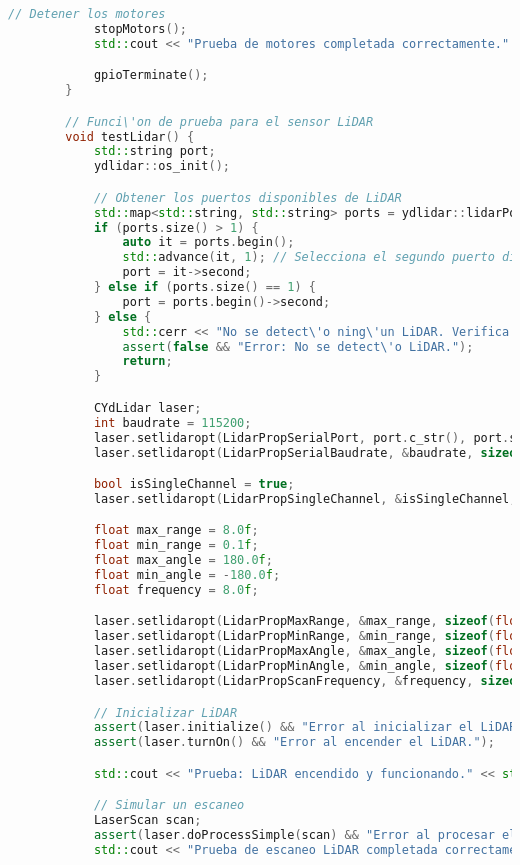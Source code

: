 \begin{lstlisting}[language={C++}, caption={C\'odigo de pruebas de integraci\'organismo}, label={swsa}]
            // Detener los motores
            stopMotors();
            std::cout << "Prueba de motores completada correctamente." << std::endl;

            gpioTerminate();
        }

        // Funci\'on de prueba para el sensor LiDAR
        void testLidar() {
            std::string port;
            ydlidar::os_init();

            // Obtener los puertos disponibles de LiDAR
            std::map<std::string, std::string> ports = ydlidar::lidarPortList();
            if (ports.size() > 1) {
                auto it = ports.begin();
                std::advance(it, 1); // Selecciona el segundo puerto disponible
                port = it->second;
            } else if (ports.size() == 1) {
                port = ports.begin()->second;
            } else {
                std::cerr << "No se detect\'o ning\'un LiDAR. Verifica la conexi\'on." << std::endl;
                assert(false && "Error: No se detect\'o LiDAR.");
                return;
            }

            CYdLidar laser;
            int baudrate = 115200;
            laser.setlidaropt(LidarPropSerialPort, port.c_str(), port.size());
            laser.setlidaropt(LidarPropSerialBaudrate, &baudrate, sizeof(int));

            bool isSingleChannel = true;
            laser.setlidaropt(LidarPropSingleChannel, &isSingleChannel, sizeof(bool));

            float max_range = 8.0f;
            float min_range = 0.1f;
            float max_angle = 180.0f;
            float min_angle = -180.0f;
            float frequency = 8.0f;

            laser.setlidaropt(LidarPropMaxRange, &max_range, sizeof(float));
            laser.setlidaropt(LidarPropMinRange, &min_range, sizeof(float));
            laser.setlidaropt(LidarPropMaxAngle, &max_angle, sizeof(float));
            laser.setlidaropt(LidarPropMinAngle, &min_angle, sizeof(float));
            laser.setlidaropt(LidarPropScanFrequency, &frequency, sizeof(float));

            // Inicializar LiDAR
            assert(laser.initialize() && "Error al inicializar el LiDAR.");
            assert(laser.turnOn() && "Error al encender el LiDAR.");

            std::cout << "Prueba: LiDAR encendido y funcionando." << std::endl;

            // Simular un escaneo
            LaserScan scan;
            assert(laser.doProcessSimple(scan) && "Error al procesar el escaneo LiDAR.");
            std::cout << "Prueba de escaneo LiDAR completada correctamente." << std::endl;


\end{lstlisting}
